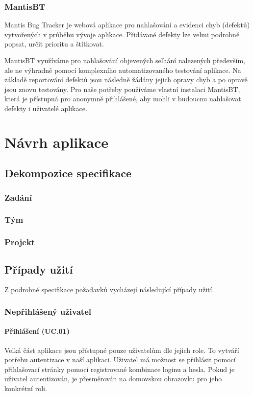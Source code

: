 \documentclass[czech,BP]{thesiskiv}
\begin{document}
\subsection{MantisBT}
	\par Mantis Bug Tracker je webová aplikace pro nahlašování a evidenci chyb (defektů) vytvořených v průběhu vývoje aplikace. Přidávané defekty lze velmi podrobně popsat, určit prioritu a štítkovat.
	\par MantisBT využíváme pro nahlašování objevených selhání nalezených především, ale ne výhradně pomocí komplexního automatizovaného testování aplikace. Na základě reportování defektů jsou následně žádány jejich opravy chyb a po opravě jsou znovu testovány. Pro naše potřeby používáme vlastní instalaci MantisBT, která je přístupná pro anonymně přihlášené, aby mohli v budoucnu nahlašovat defekty i uživatelé aplikace.
\chapter{Návrh aplikace}

	\section{Dekompozice specifikace}
		\subsection{Zadání}
		
		\subsection{Tým}
		\subsection{Projekt}
	\section{Případy užití}
		\par Z podrobné specifikace požadavků vycházejí následující případy užití.
		\subsection{Nepřihlášený uživatel}
			\subsubsection{Přihlášení (UC.01)}
				\par Velká část aplikace jsou přístupné pouze uživatelům dle jejich role. To vytváří potřebu autentizace v naší aplikaci. Uživatel má možnost se přihlásit pomocí přihlašovací stránky pomocí registrované kombinace loginu a hesla. Pokud je uživatel autentizován, je přesměrován na domovskou obrazovku pro jeho konkrétní roli.
\end{document}
